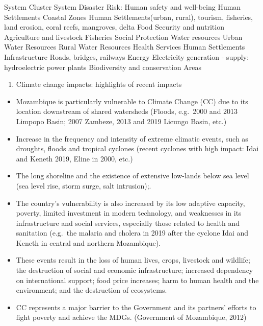 \documentclass[
]{book}
\providecommand{\tightlist}{%
  \setlength{\itemsep}{0pt}\setlength{\parskip}{0pt}}
\begin{document}
System Cluster System
Disaster Risk: Human safety and well-being Human Settlements
Coastal Zones Human Settlements(urban, rural), tourism, fisheries, land erosion, coral reefs, mangroves, delta
Food Security and nutrition Agriculture and livestock
Fisheries
Social Protection
Water resources Urban Water Resources
Rural Water Resources
Health Services Human Settlements
Infrastructure Roads, bridges, railways
Energy Electricity generation - supply: hydroelectric power plants
Biodiversity and conservation Areas

\begin{enumerate}
\def\labelenumi{\alph{enumi}.}
\setcounter{enumi}{2}
\tightlist
\item
  Climate change impacts: highlights of recent impacts
\end{enumerate}

\begin{itemize}
\tightlist
\item
  Mozambique is particularly vulnerable to Climate Change (CC) due to its location downstream of shared watersheds (Floods, e.g.~2000 and 2013 Limpopo Basin; 2007 Zambeze, 2013 and 2019 Licungo Basin, etc.)
\item
  Increase in the frequency and intensity of extreme climatic events, such as droughts, floods and tropical cyclones (recent cyclones with high impact: Idai and Keneth 2019, Eline in 2000, etc.)
\item
  The long shoreline and the existence of extensive low-lands below sea level (sea level rise, storm surge, salt intrusion);.
\item
  The country's vulnerability is also increased by its low adaptive capacity, poverty, limited investment in modern technology, and weaknesses in its infrastructure and social services, especially those related to health and sanitation (e.g.~the malaria and cholera in 2019 after the cyclone Idai and Keneth in central and northern Mozambique).
\item
  These events result in the loss of human lives, crops, livestock and wildlife; the destruction of social and economic infrastructure; increased dependency on international support; food price increases; harm to human health and the environment; and the destruction of ecosystems.
\item
  CC represents a major barrier to the Government and its partners' efforts to fight poverty and achieve the MDGs. (Government of Mozambique, 2012)
\end{itemize}
\end{document}
